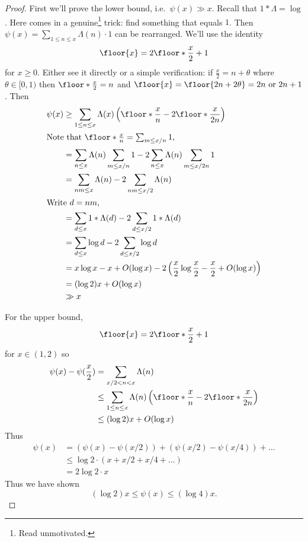 \documentclass[a4paper]{article}
\theoremstyle{definition}
\begin{document}
\begin{proof}
  First we'll prove the lower bound, i.e.\ \(\psi(x) \gg x\). Recall that \(1 * \Lambda = \log\). Here comes in a genuine\footnote{Read unmotivated.} trick: find something that equals \(1\). Then \(\psi(x) = \sum_{1 \leq n \leq x} \Lambda(n) \cdot 1\) can be rearranged. We'll use the identity
  \[
    \floor{x} = 2 \floor*{\frac{x}{2}} + 1
  \]
  for \(x \geq 0\). Either see it directly or a simple verification: if \(\frac{x}{2} = n + \theta\) where \(\theta \in [0, 1)\) then \(\floor*{\frac{x}{2}} = n\) and \(\floor{x} = \floor{2n + 2\theta} = 2n \text{ or } 2n + 1\). Then
  \begin{align*}
    \psi(x)
    &\geq \sum_{1 \leq n \leq x} \Lambda(x) \left( \floor*{\frac{x}{n}} - 2 \floor*{\frac{x}{2n}} \right)\\
    \intertext{Note that \(\floor*{\frac{x}{n}} = \sum_{m \leq x/n} 1\),}
    &=\sum_{n \leq x} \Lambda(n) \sum_{m \leq x/n} 1 - 2 \sum_{n \leq x} \Lambda(n) \sum_{m \leq x/2n} 1 \\
    &=  \sum_{nm \leq x} \Lambda(n) - 2 \sum_{nm \leq x/2} \Lambda(n) \\
    \intertext{Write \(d = nm\),}
    &= \sum_{d \leq x} 1 * \Lambda(d) - 2 \sum_{d \leq x/2} 1 * \Lambda(d) \\
    &= \sum_{d \leq x} \log d - 2 \sum_{d \leq x/2} \log d \\
    &= x \log x - x + O(\log x) - 2 \left( \frac{x}{2} \log \frac{x}{2} - \frac{x}{2} + O(\log x) \right) \\
    &= (\log 2) x + O(\log x) \\
    &\gg x
  \end{align*}

  For the upper bound,
  \[
    \floor{x} = 2 \floor*{\frac{x}{2}} + 1
  \]
  for \(x \in (1, 2)\) so
  \begin{align*}
    \psi(x) - \psi(\frac{x}{2})
    &= \sum_{x/2 < n < x} \Lambda(n) \\
    &\leq \sum_{1 \leq n \leq x} \Lambda(n) \left( \floor*{\frac{x}{n}} - 2 \floor*{\frac{x}{2n}} \right) \\
    & \leq (\log 2) x + O(\log x)
  \end{align*}
  Thus
  \begin{align*}
    \psi(x)
    &= (\psi(x) - \psi(x/2)) + (\psi(x/2) - \psi(x/4)) + \dots \\
    &\leq \log 2 \cdot (x + x/2 + x/4 + \dots ) \\
    &= 2 \log 2 \cdot x
  \end{align*}
  Thus we have shown
  \[
    (\log 2) x \leq \psi(x) \leq (\log 4) x.
  \]
\end{proof}
\end{document}
